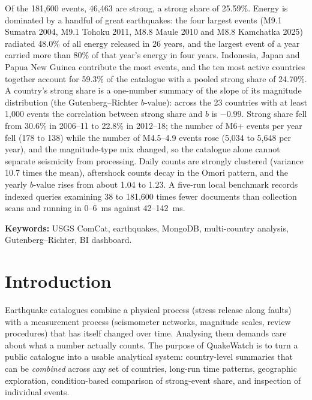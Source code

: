 \documentclass[11pt,a4paper]{article}
\begin{document}
Of the 181,600 events, 46,463 are strong, a strong share of 25.59\%. Energy is dominated by a handful of great earthquakes: the four largest events (M9.1 Sumatra 2004, M9.1 Tohoku 2011, M8.8 Maule 2010 and M8.8 Kamchatka 2025) radiated 48.0\% of all energy released in 26 years, and the largest event of a year carried more than 80\% of that year's energy in four years. Indonesia, Japan and Papua New Guinea contribute the most events, and the ten most active countries together account for 59.3\% of the catalogue with a pooled strong share of 24.70\%. A country's strong share is a one-number summary of the slope of its magnitude distribution (the Gutenberg--Richter $b$-value): across the 23 countries with at least 1,000 events the correlation between strong share and $b$ is $-0.99$. Strong share fell from 30.6\% in 2006--11 to 22.8\% in 2012--18; the number of M6+ events per year fell (178 to 138) while the number of M4.5--4.9 events rose (5,034 to 5,648 per year), and the magnitude-type mix changed, so the catalogue alone cannot separate seismicity from processing. Daily counts are strongly clustered (variance 10.7 times the mean), aftershock counts decay in the Omori pattern, and the yearly $b$-value rises from about 1.04 to 1.23. A five-run local benchmark records indexed queries examining 38 to 181,600 times fewer documents than collection scans and running in 0--6~ms against 42--142~ms.

\medskip\noindent\textbf{Keywords:} USGS ComCat, earthquakes, MongoDB, multi-country analysis, Gutenberg--Richter, BI dashboard.

\tableofcontents
\newpage

\section{Introduction}
Earthquake catalogues combine a physical process (stress release along faults) with a measurement process (seismometer networks, magnitude scales, review procedures) that has itself changed over time. Analysing them demands care about what a number actually counts. The purpose of QuakeWatch is to turn a public catalogue into a usable analytical system: country-level summaries that can be \emph{combined} across any set of countries, long-run time patterns, geographic exploration, condition-based comparison of strong-event share, and inspection of individual events.
\end{document}
